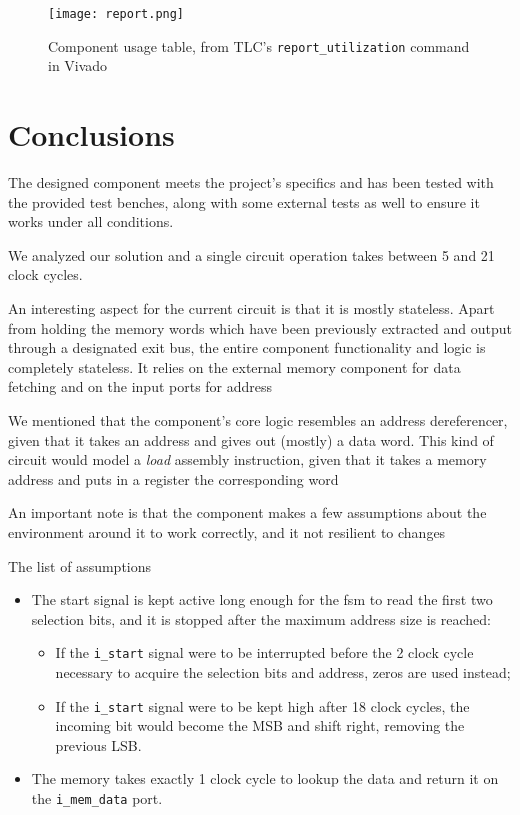 \documentclass[12pt,a4paper]{article}
\newcommand{\code}{\texttt}
\begin{document}
        \vspace{1cm}
            \begin{figure}[H]
            	\centering
            	\texttt{[image: report.png]}
            	\caption{Component usage table, from TLC's \code{report\_utilization} command in Vivado}
            	\label{fig:schema}
            \end{figure}

            

        \newpage
	\section{Conclusions}

        The designed component meets the project's specifics and has been tested with the provided test benches, along with some external tests as well to ensure it works under all conditions.

        We analyzed our solution and a single circuit operation takes between 5 and 21 clock cycles.        

        An interesting aspect for the current circuit is that it is mostly stateless. Apart from holding the memory words which have been previously extracted and output through a designated exit bus, the entire component functionality and logic is completely stateless. It relies on the external memory component for data fetching and on the input ports for address 

        We mentioned that the component's core logic resembles an address dereferencer, given that it takes an address and gives out (mostly) a data word. This kind of circuit would model a \textit{load} assembly instruction, given that it takes a memory address and puts in a register the corresponding word

        An important note is that the component makes a few assumptions about the environment around it to work correctly, and it not resilient to changes

        The list of assumptions 

	\begin{itemize}
			\item The start signal is kept active long enough for the fsm to read the first two selection bits, and it is stopped after the maximum address size is reached:
   
                \begin{itemize}[label=$\star$]
			         \item If the \code{i\_start} signal were to be interrupted before the 2 clock cycle necessary to acquire the selection bits and address, zeros are used instead;
			         \item If the \code{i\_start} signal were to be kept high after 18 clock cycles, the incoming bit would become the MSB and shift right, removing the previous LSB.
		    \end{itemize}
      
			\item The memory takes exactly 1 clock cycle to lookup the data and return it on the \code{i\_mem\_data} port.
	\end{itemize}
\end{document}
